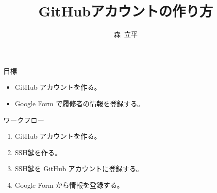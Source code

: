 \documentclass[a4paper,11pt, article]{memoir}
\title{GitHubアカウントの作り方}
\author{森~立平}
\date{}
\begin{document}
\maketitle

\noindent
目標
\begin{itemize}
\item GitHub アカウントを作る。
\item Google Form で履修者の情報を登録する。
\end{itemize}


\noindent
ワークフロー
\begin{enumerate}
\item GitHub アカウントを作る。
\item SSH鍵を作る。
\item SSH鍵を GitHub アカウントに登録する。
\item Google Form から情報を登録する。
\end{enumerate}
\end{document}
